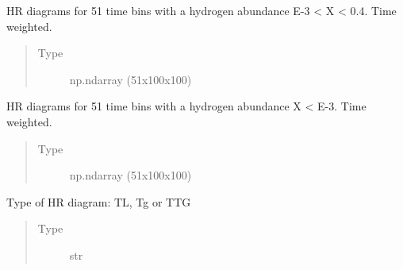 \documentclass[letterpaper,10pt,english]{sphinxmanual}
\begin{document}
\begin{fulllineitems}
\begin{fulllineitems}
\end{fulllineitems}


\begin{fulllineitems}
\label{\detokenize{hrdiagrams:hoki.hrdiagrams.HRDiagram.self.medium_H}}
HR diagrams for 51 time bins with a hydrogen abundance E-3 \textless{} X \textless{} 0.4. Time weighted.
\begin{quote}\begin{description}
\item[{Type}] \leavevmode
np.ndarray (51x100x100)

\end{description}\end{quote}

\end{fulllineitems}


\begin{fulllineitems}
\label{\detokenize{hrdiagrams:hoki.hrdiagrams.HRDiagram.self.low_H}}
HR diagrams for 51 time bins with a hydrogen abundance X \textless{} E-3. Time weighted.
\begin{quote}\begin{description}
\item[{Type}] \leavevmode
np.ndarray (51x100x100)

\end{description}\end{quote}

\end{fulllineitems}


\begin{fulllineitems}
\label{\detokenize{hrdiagrams:hoki.hrdiagrams.HRDiagram.self.type}}
Type of HR diagram: TL, Tg or TTG
\begin{quote}\begin{description}
\item[{Type}] \leavevmode
str

\end{description}\end{quote}


\end{fulllineitems}
\end{fulllineitems}
\end{document}
